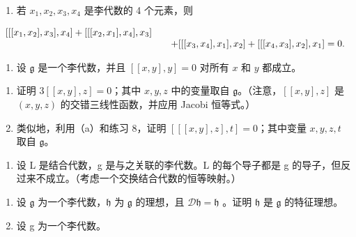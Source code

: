 \begin{enumerate}
\def\labelenumi{\arabic{enumi}.}
\setcounter{enumi}{7}
\tightlist
\item
  若 \(x_{1}, x_{2}, x_{3}, x_{4}\) 是李代数的 4 个元素，则
\end{enumerate}

\[
\begin{array}{r l} {[ [ [ x _ {1}, x _ {2} ], x _ {3} ], x _ {4} ] + [ [ [ x _ {2}, x _ {1} ], x _ {4} ], x _ {3} ]} & \\ & \quad + [ [ [ x _ {3}, x _ {4} ], x _ {1} ], x _ {2} ] + [ [ [ x _ {4}, x _ {3} ], x _ {2} ], x _ {1} ] = 0. \end{array}
\]

\begin{enumerate}
\def\labelenumi{\arabic{enumi}.}
\setcounter{enumi}{8}
\tightlist
\item
  设 \(\mathfrak{g}\) 是一个李代数，并且 \([[x,y],y] = 0\) 对所有 \(x\) 和 \(y\) 都成立。
\end{enumerate}

\begin{enumerate}
\def\labelenumi{(\alph{enumi})}
\item
  证明 \(3[[x,y],z] = 0\)；其中 \(x,y,z\) 中的变量取自 \(\mathfrak{g}\)。（注意，\([[x,y],z]\) 是 \((x,y,z)\) 的交错三线性函数，并应用 Jacobi 恒等式。）
\item
  类似地，利用（a）和练习 8，证明 \(\left[[[x,y],z],t\right]=0\)；其中变量 \(x,y,z,t\) 取自 \(\mathfrak{g}\)。
\end{enumerate}

\begin{enumerate}
\def\labelenumi{\arabic{enumi}.}
\setcounter{enumi}{9}
\tightlist
\item
  设 L 是结合代数，g 是与之关联的李代数。L 的每个导子都是 g 的导子，但反过来不成立。（考虑一个交换结合代数的恒等映射。）
\end{enumerate}
\relax{}
\begin{enumerate}
\def\labelenumi{\arabic{enumi}.}
\setcounter{enumi}{10}
\item
  设 \(\mathfrak{g}\) 为一个李代数，\(\mathfrak{h}\) 为 \(\mathfrak{g}\) 的理想，且 \(\mathcal{D}\mathfrak{h} = \mathfrak{h}\) 。证明 \(\mathfrak{h}\) 是 \(\mathfrak{g}\) 的特征理想。
\item
  设 g 为一个李代数。
\end{enumerate}

